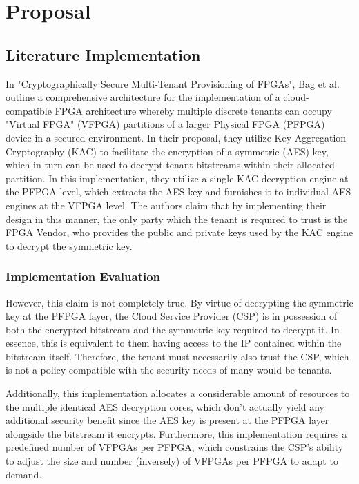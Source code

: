\chapter{Proposal}\label{chap:Proposal}
\section{Literature Implementation}\label{sec:LitImpl}

In "Cryptographically Secure Multi-Tenant Provisioning of FPGAs"\cite{bag_cryptographically_2020}, Bag et al. outline a comprehensive architecture for the implementation of a cloud-compatible FPGA architecture whereby multiple discrete tenants can occupy "Virtual FPGA" (VFPGA) partitions of a larger Physical FPGA (PFPGA) device in a secured environment. In their proposal, they utilize Key Aggregation Cryptography (KAC) to facilitate the encryption of a symmetric (AES) key, which in turn can be used to decrypt tenant bitstreams within their allocated partition. In this implementation, they utilize a single KAC decryption engine at the PFPGA level, which extracts the AES key and furnishes it to individual AES engines at the VFPGA level. The authors claim that by implementing their design in this manner, the only party which the tenant is required to trust is the FPGA Vendor, who provides the public and private keys used by the KAC engine to decrypt the symmetric key.

\subsection{Implementation Evaluation}\label{subsec:LitEval}

However, this claim is not completely true. By virtue of decrypting the symmetric key at the PFPGA layer, the Cloud Service Provider (CSP) is in possession of both the encrypted bitstream and the symmetric key required to decrypt it. In essence, this is equivalent to them having access to the IP contained within the bitstream itself. Therefore, the tenant must necessarily also trust the CSP, which is not a policy compatible with the security needs of many would-be tenants.

Additionally, this implementation allocates a considerable amount of resources to the multiple identical AES decryption cores, which don't actually yield any additional security benefit since the AES key is present at the PFPGA layer alongside the bitstream it encrypts. Furthermore, this implementation requires a predefined number of VFPGAs per PFPGA, which constrains the CSP's ability to adjust the size and number (inversely) of VFPGAs per PFPGA to adapt to demand.

